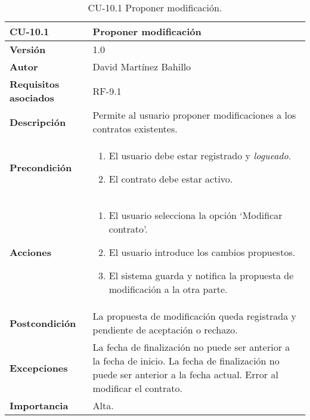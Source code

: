 \begin{table}[p]
	\centering
	\begin{tabularx}{\linewidth}{ p{} p{} }
		\toprule
		\textbf{CU-10.1}  & \textbf{Proponer modificación}\\
		\midrule
		\textbf{Versión}              & 1.0    \\
		\textbf{Autor}                & David Martínez Bahillo \\
		\textbf{Requisitos asociados} & RF-9.1 \\
		\textbf{Descripción}          & Permite al usuario proponer modificaciones a los contratos existentes. \\
		\textbf{Precondición}         &  
		\begin{enumerate}
			\item El usuario debe estar registrado y \textit{logueado}.
			\item El contrato debe estar activo.
		\end{enumerate}\\
		\textbf{Acciones}             &
		\begin{enumerate}
			\item El usuario selecciona la opción `Modificar contrato'.
			\item El usuario introduce los cambios propuestos.
			\item El sistema guarda y notifica la propuesta de modificación a la otra parte.
		\end{enumerate}\\
		\textbf{Postcondición}        & La propuesta de modificación queda registrada y pendiente de aceptación o rechazo. \\
		\textbf{Excepciones}          & La fecha de finalización no puede ser anterior a la fecha de inicio. La fecha de finalización no puede ser anterior a la fecha actual. Error al modificar el contrato. \\
		\textbf{Importancia}          & Alta. \\
		\bottomrule
	\end{tabularx}
	\caption{CU-10.1 Proponer modificación.}
\end{table}


